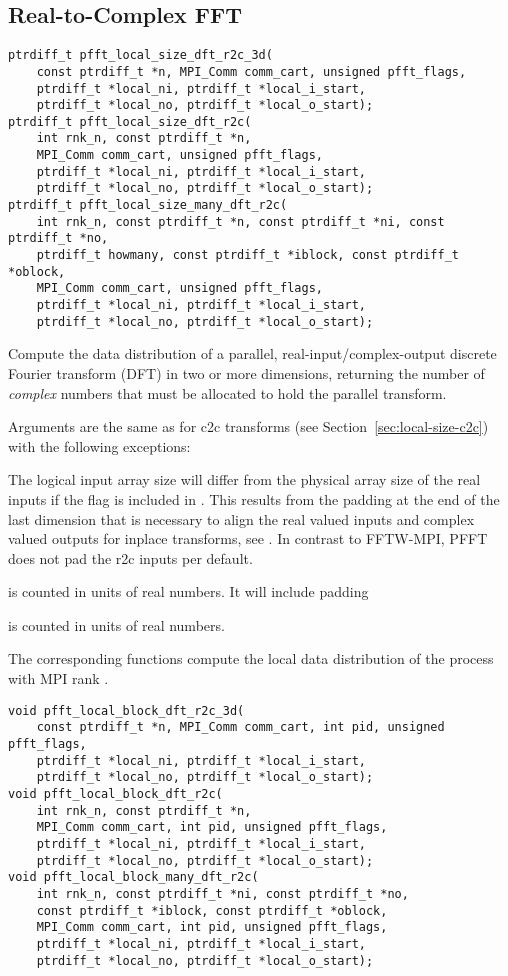 \subsection{Real-to-Complex FFT}\label{sec:local-size-r2c}
\begin{lstlisting}
ptrdiff_t pfft_local_size_dft_r2c_3d(
    const ptrdiff_t *n, MPI_Comm comm_cart, unsigned pfft_flags,
    ptrdiff_t *local_ni, ptrdiff_t *local_i_start,
    ptrdiff_t *local_no, ptrdiff_t *local_o_start);
ptrdiff_t pfft_local_size_dft_r2c(
    int rnk_n, const ptrdiff_t *n,
    MPI_Comm comm_cart, unsigned pfft_flags,
    ptrdiff_t *local_ni, ptrdiff_t *local_i_start,
    ptrdiff_t *local_no, ptrdiff_t *local_o_start);
ptrdiff_t pfft_local_size_many_dft_r2c(
    int rnk_n, const ptrdiff_t *n, const ptrdiff_t *ni, const ptrdiff_t *no,
    ptrdiff_t howmany, const ptrdiff_t *iblock, const ptrdiff_t *oblock,
    MPI_Comm comm_cart, unsigned pfft_flags,
    ptrdiff_t *local_ni, ptrdiff_t *local_i_start,
    ptrdiff_t *local_no, ptrdiff_t *local_o_start);
\end{lstlisting}
Compute the data distribution of a parallel, real-input/complex-output discrete Fourier transform (DFT) in two or more dimensions,
returning the number of \emph{complex} numbers that must be allocated to hold the parallel transform.

Arguments are the same as for c2c transforms (see Section~\ref{sec:local-size-c2c}) with the following exceptions:
\begin{compactitem}
  \item The logical input array size  will differ from the physical array size of the real inputs if the flag 
        is included in . This results from the padding at the end of the last dimension that is necessary to
        align the real valued inputs and complex valued outputs for inplace transforms, see \cite{fftw-r2c-padding}.
        In contrast to FFTW-MPI, PFFT does not pad the r2c inputs per default.
  \item {} is counted in units of real numbers. It will include padding
  \item {} is counted in units of real numbers.
\end{compactitem}

The corresponding  functions compute the local data distribution of the process with MPI rank .
\begin{lstlisting}
void pfft_local_block_dft_r2c_3d(
    const ptrdiff_t *n, MPI_Comm comm_cart, int pid, unsigned pfft_flags,
    ptrdiff_t *local_ni, ptrdiff_t *local_i_start,
    ptrdiff_t *local_no, ptrdiff_t *local_o_start);
void pfft_local_block_dft_r2c(
    int rnk_n, const ptrdiff_t *n,
    MPI_Comm comm_cart, int pid, unsigned pfft_flags,
    ptrdiff_t *local_ni, ptrdiff_t *local_i_start,
    ptrdiff_t *local_no, ptrdiff_t *local_o_start);
void pfft_local_block_many_dft_r2c(
    int rnk_n, const ptrdiff_t *ni, const ptrdiff_t *no,
    const ptrdiff_t *iblock, const ptrdiff_t *oblock,
    MPI_Comm comm_cart, int pid, unsigned pfft_flags,
    ptrdiff_t *local_ni, ptrdiff_t *local_i_start,
    ptrdiff_t *local_no, ptrdiff_t *local_o_start);
\end{lstlisting}

